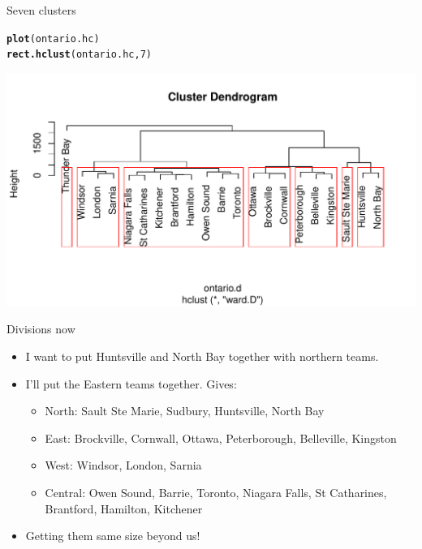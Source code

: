 \documentclass[unknownkeysallowed]{beamer}\usepackage[]{graphicx}\usepackage[]{color}
\makeatletter
\def\maxwidth{ %
  \ifdim\Gin@nat@width>\linewidth
    \linewidth
  \else
    \Gin@nat@width
  \fi
}
\newcommand{\hlnum}[1]{\textcolor[rgb]{0.686,0.059,0.569}{#1}}%
\newcommand{\hlstd}[1]{\textcolor[rgb]{0.345,0.345,0.345}{#1}}%
\newcommand{\hlkwd}[1]{\textcolor[rgb]{0.737,0.353,0.396}{\textbf{#1}}}%
\newenvironment{kframe}{%
 \def\at@end@of@kframe{}%
 \ifinner\ifhmode%
  \def\at@end@of@kframe{\end{minipage}}%
  \begin{minipage}{\columnwidth}%
 \fi\fi%
 \def\FrameCommand##1{\hskip\@totalleftmargin \hskip-\fboxsep
 \colorbox{shadecolor}{##1}\hskip-\fboxsep
     \hskip-\linewidth \hskip-\@totalleftmargin \hskip\columnwidth}%
 \MakeFramed {\advance\hsize-\width
   \@totalleftmargin\z@ \linewidth\hsize
   \@setminipage}}%
 {\par\unskip\endMakeFramed%
 \at@end@of@kframe}
\newenvironment{knitrout}{}{} %
\makeatother
\begin{document}
\begin{frame}[fragile]{Seven clusters}
  
\begin{knitrout}
\color{fgcolor}\begin{kframe}
\begin{alltt}
\hlkwd{plot}\hlstd{(ontario.hc)}
\hlkwd{rect.hclust}\hlstd{(ontario.hc,}\hlnum{7}\hlstd{)}
\end{alltt}
\end{kframe}
\includegraphics[width=\maxwidth]{figure/unnamed-chunk-380-1} 

\end{knitrout}
  
\end{frame}

\begin{frame}[fragile]{Divisions now}
  
  \begin{itemize}
  \item I want to put Huntsville and North Bay together with northern teams.
  \item I'll put the Eastern teams together. Gives:
    \begin{itemize}
    \item North: Sault Ste Marie, Sudbury, Huntsville, North Bay
    \item East: Brockville, Cornwall, Ottawa, Peterborough,
      Belleville, Kingston
    \item West:  Windsor, London, Sarnia
    \item Central: Owen Sound, Barrie, Toronto, Niagara Falls, St
      Catharines, Brantford, Hamilton, Kitchener
    \end{itemize}
  \item Getting them same size beyond us!
  \end{itemize}
  
\end{frame}
\end{document}
